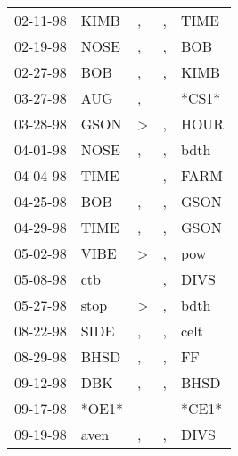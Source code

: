 \begin{supertabular}{p{0.07\textwidth}p{0.06\textwidth}p{0.02\textwidth}p{0.02\textwidth}p{0.06\textwidth}}
 02-11-98\textsuperscript{} &  KIMB\textsuperscript{} &             , &  , &           TIME\textsuperscript{} \\
 02-19-98\textsuperscript{} &  NOSE\textsuperscript{} &             , &  , &            BOB\textsuperscript{} \\
 02-27-98\textsuperscript{} &   BOB\textsuperscript{} &             , &  , &           KIMB\textsuperscript{} \\
 03-27-98\textsuperscript{} &   AUG\textsuperscript{} &             , &    &                            *CS1* \\
 03-28-98\textsuperscript{} &  GSON\textsuperscript{} &  \textgreater &  , &           HOUR\textsuperscript{} \\
 04-01-98\textsuperscript{} &  NOSE\textsuperscript{} &             , &  , &           bdth\textsuperscript{} \\
 04-04-98\textsuperscript{} &  TIME\textsuperscript{} &               &  , &           FARM\textsuperscript{} \\
 04-25-98\textsuperscript{} &   BOB\textsuperscript{} &             , &  , &           GSON\textsuperscript{} \\
 04-29-98\textsuperscript{} &  TIME\textsuperscript{} &             , &  , &           GSON\textsuperscript{} \\
 05-02-98\textsuperscript{} &  VIBE\textsuperscript{} &  \textgreater &  , &            pow\textsuperscript{} \\
 05-08-98\textsuperscript{} &   ctb\textsuperscript{} &               &  , &           DIVS\textsuperscript{} \\
 05-27-98\textsuperscript{} &  stop\textsuperscript{} &  \textgreater &  , &           bdth\textsuperscript{} \\
 08-22-98\textsuperscript{} &  SIDE\textsuperscript{} &             , &  , &           celt\textsuperscript{} \\
 08-29-98\textsuperscript{} &  BHSD\textsuperscript{} &             , &  , &             FF\textsuperscript{} \\
 09-12-98\textsuperscript{} &   DBK\textsuperscript{} &             , &  , &           BHSD\textsuperscript{} \\
 09-17-98\textsuperscript{} &                   *OE1* &               &    &                            *CE1* \\
 09-19-98\textsuperscript{} &  aven\textsuperscript{} &             , &  , &           DIVS\textsuperscript{} \\

\end{supertabular}

